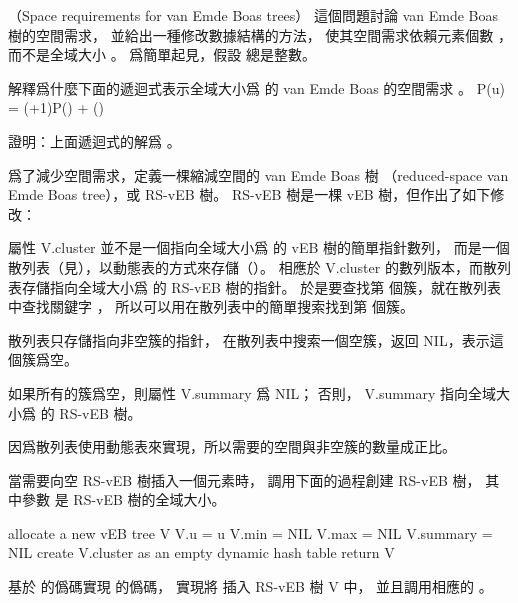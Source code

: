 \startsubject[
  title={Problems},
]

（Space requirements for van Emde Boas trees）
這個問題討論 van Emde Boas 樹的空間需求，
並給出一種修改數據結構的方法，
使其空間需求依賴元素個數 ，
而不是全域大小 。
爲簡單起見，假設  總是整數。

\startigBase[a]\startitem
解釋爲什麼下面的遞迴式表示全域大小爲  的 van Emde Boas 的空間需求 。
\startformula
P(u) = (+1)P() + \Theta()
\stopformula

\stopitem\stopigBase

\startANSWER
{}
\stopANSWER

\startigBase[continue]\startitem
證明：上面遞迴式的解爲 。
\stopitem\stopigBase

\startANSWER
{}
\stopANSWER

爲了減少空間需求，定義一棵{\EMP 縮減空間的 van Emde Boas 樹}
（reduced-space van Emde Boas tree），或 {\EMP RS-vEB 樹}。
 RS-vEB 樹是一棵 vEB 樹，但作出了如下修改：
\startigNum[1]
\item 屬性 V.cluster 並不是一個指向全域大小爲  的 vEB 樹的簡單指針數列，
而是一個散列表（見），以動態表的方式來存儲（）。
相應於 V.cluster 的數列版本，而散列表存儲指向全域大小爲  的 RS-vEB 樹的指針。
於是要查找第  個簇，就在散列表中查找關鍵字 ，
所以可以用在散列表中的簡單搜索找到第  個簇。

\item 散列表只存儲指向非空簇的指針，
在散列表中搜索一個空簇，返回 NIL，表示這個簇爲空。

\item 如果所有的簇爲空，則屬性 V.summary 爲 NIL；
否則， V.summary 指向全域大小爲  的 RS-vEB 樹。
\stopigNum

因爲散列表使用動態表來實現，所以需要的空間與非空簇的數量成正比。

當需要向空 RS-vEB 樹插入一個元素時，
調用下面的過程創建 RS-vEB 樹，
其中參數  是 RS-vEB 樹的全域大小。

\startCLRS
allocate a new vEB tree V
V.u = u
V.min = NIL
V.max = NIL
V.summary = NIL
create V.cluster as an empty dynamic hash table
return V
\stopCLRS

\startigBase[continue]\startitem
基於  的僞碼實現  的僞碼，
實現將  插入 RS-vEB 樹 V 中，
並且調用相應的 。
\stopitem\stopigBase

